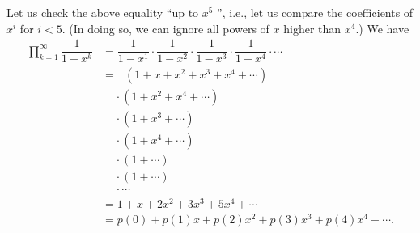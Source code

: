 \begin{example}
Let us check the above equality \textquotedblleft up to $x^{5}$%
\textquotedblright, i.e., let us compare the coefficients of $x^{i}$ for
$i<5$. (In doing so, we can ignore all powers of $x$ higher than $x^{4}$.) We
have%
\begin{align*}
\prod_{k=1}^{\infty}\dfrac{1}{1-x^{k}}  &  =\dfrac{1}{1-x^{1}}\cdot\dfrac
{1}{1-x^{2}}\cdot\dfrac{1}{1-x^{3}}\cdot\dfrac{1}{1-x^{4}}\cdot\cdots\\
&  =\ \ \ \left(  1+x+x^{2}+x^{3}+x^{4}+\cdots\right) \\
&  \ \ \ \ \ \cdot\left(  1+x^{2}+x^{4}+\cdots\right) \\
&  \ \ \ \ \ \cdot\left(  1+x^{3}+\cdots\right) \\
&  \ \ \ \ \ \cdot\left(  1+x^{4}+\cdots\right) \\
&  \ \ \ \ \ \cdot\left(  1+\cdots\right) \\
&  \ \ \ \ \ \cdot\left(  1+\cdots\right) \\
&  \ \ \ \ \ \cdot\cdots\\
&  =1+x+2x^{2}+3x^{3}+5x^{4}+\cdots\\
&  =p\left(  0\right)  +p\left(  1\right)  x+p\left(  2\right)  x^{2}+p\left(
3\right)  x^{3}+p\left(  4\right)  x^{4}+\cdots.
\end{align*}

\end{example}

